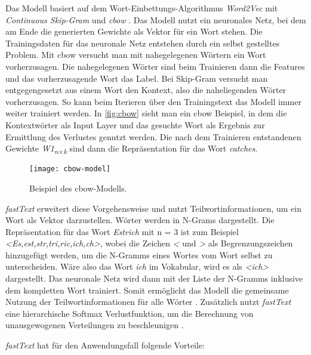 Das Modell basiert auf dem Wort-Einbettungs-Algorithmus \textit{Word2Vec} mit \textit{Continuous Skip-Gram} und \textit{\ac{cbow}} \citep[vgl.][]{bojanowski2017enriching}. Das Modell nutzt ein neuronales Netz, bei dem am Ende die generierten Gewichte als Vektor für ein Wort stehen. Die Trainingsdaten für das neuronale Netz entstehen durch ein selbst gestelltes Problem. Mit \ac{cbow} versucht man mit nahegelegenen Wörtern ein Wort vorherzusagen. Die nahegelegenen Wörter sind beim Trainieren dann die Features und das vorherzusagende Wort das Label. Bei Skip-Gram versucht man entgegengesetzt aus einem Wort den Kontext, also die naheliegenden Wörter vorherzusagen. So kann beim Iterieren über den Trainingstext das Modell immer weiter trainiert werden. In \autoref{fig:cbow} sieht man ein \ac{cbow} Beispiel, in dem die Kontextwörter als Input Layer und das gesuchte Wort als Ergebnis zur Ermittlung des Verlustes genutzt werden. Die nach dem Trainieren entstandenen Gewichte \textit{W1\textsubscript{n$\times $k}}\: sind dann die Repräsentation für das Wort \textit{\glqq catches\grqq{}}.

\begin{figure}[h]
	\centering
	\texttt{[image: cbow-model]}
	\caption{Beispiel des \ac{cbow}-Modells.}
	\label{fig:cbow}
\end{figure}

\textit{fastText} erweitert diese Vorgehensweise und nutzt Teilwortinformationen, um ein Wort als Vektor darzustellen. Wörter werden in N-Grams dargestellt. \citep[vgl.][]{bojanowski2017enriching} Die Repräsentation für das Wort \textit{Estrich} mit n = 3 ist zum Beispiel \textit{<Es,est,str,tri,ric,ich,ch>}, wobei die Zeichen \textit{<} und \textit{>} als Begrenzungszeichen hinzugefügt werden, um die N-Gramms eines Wortes vom Wort selbst zu unterscheiden. Wäre also das Wort \textit{ich} im Vokabular, wird es als \textit{<ich>} dargestellt. Das neuronale Netz wird dann mit der Liste der N-Gramms inklusive dem kompletten Wort trainiert. Somit ermöglicht das Modell die gemeinsame Nutzung der Teilwortinformationen für alle Wörter \citep[vgl.][]{bojanowski2017enriching}. Zusätzlich nutzt \textit{fastText} eine hierarchische Softmax Verlustfunktion, um die Berechnung von unausgewogenen Verteilungen zu beschleunigen \citep[vgl.][]{fastText_release2016}.

\textit{fastText} hat für den Anwendungsfall folgende Vorteile:

